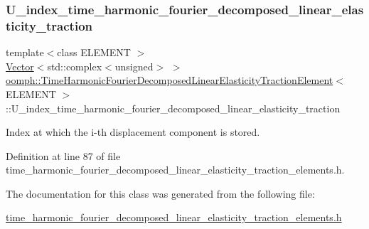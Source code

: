 \mbox{\label{classoomph_1_1TimeHarmonicFourierDecomposedLinearElasticityTractionElement_a99d3de6c501d6041662ac66cafa90af1}} 
\subsubsection{\texorpdfstring{U\+\_\+index\+\_\+time\+\_\+harmonic\+\_\+fourier\+\_\+decomposed\+\_\+linear\+\_\+elasticity\+\_\+traction}{U\_index\_time\_harmonic\_fourier\_decomposed\_linear\_elasticity\_traction}}
{\footnotesize\ttfamily template$<$class E\+L\+E\+M\+E\+NT $>$ \\
\hyperlink{classoomph_1_1Vector}{Vector}$<$std\+::complex$<$unsigned$>$ $>$ \hyperlink{classoomph_1_1TimeHarmonicFourierDecomposedLinearElasticityTractionElement}{oomph\+::\+Time\+Harmonic\+Fourier\+Decomposed\+Linear\+Elasticity\+Traction\+Element}$<$ E\+L\+E\+M\+E\+NT $>$\+::U\+\_\+index\+\_\+time\+\_\+harmonic\+\_\+fourier\+\_\+decomposed\+\_\+linear\+\_\+elasticity\+\_\+traction\hspace{0.3cm}{\ttfamily [protected]}}



Index at which the i-\/th displacement component is stored. 



Definition at line 87 of file time\+\_\+harmonic\+\_\+fourier\+\_\+decomposed\+\_\+linear\+\_\+elasticity\+\_\+traction\+\_\+elements.\+h.



The documentation for this class was generated from the following file\+:\begin{DoxyCompactItemize}
\item 
\hyperlink{time__harmonic__fourier__decomposed__linear__elasticity__traction__elements_8h}{time\+\_\+harmonic\+\_\+fourier\+\_\+decomposed\+\_\+linear\+\_\+elasticity\+\_\+traction\+\_\+elements.\+h}\end{DoxyCompactItemize}
